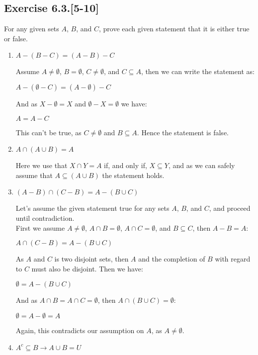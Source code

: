 \documentclass{report}
\newcommand{\cent}[1]{\begin{center}#1\end{center}}
\newcommand{\Exercise}[1]{\subsection{Exercise #1}}
\begin{document}
 	\Exercise{6.3.[5-10]}
 	
 	For any given sets $A$, $B$, and $C$, prove each given statement that it is either true or false.
 	
 	\begin{enumerate}
 		\item $ A - (B - C) = (A-B)-C $
 		
 		Assume $A\neq \emptyset$, $B = \emptyset$, $C \neq \emptyset$, and $C \subseteq A$, then we can write the statement as:
 		
 		\cent{$A - (\emptyset - C) = (A-\emptyset)-C$}
 		
 		And as $X - \emptyset = X$ and $\emptyset - X = \emptyset$ we have:
 		
 		\cent{$A = A-C$}
 		
 		This can't be true, as $C \neq \emptyset$ and $B \subseteq A$. Hence the statement is false.
 		
 		\item $ A \cap (A \cup B) = A $
 		
 		Here we use that $X \cap Y = A$ if, and only if, $X \subseteq Y$,  and as we can safely assume that $A \subseteq (A \cup B)$
 		the statement holds.
 		
 		\item $ (A-B) \cap (C-B) = A - (B \cup C)  $
 		
 		Let's assume the given statement true for any sets $A$, $B$, and $C$, and proceed until contradiction.\\
 		
 		First we assume $A \neq \emptyset$, $A \cap B = \emptyset$, $ A \cap C = \emptyset $, and $B \subseteq C$, then $A-B = A$:
 		
 		\cent{$ A \cap (C-B) = A - (B \cup C)  $}
 		
 		As $A$ and $C$ is two disjoint sets, then $A$ and the completion of $B$ with regard to $C$ must also be disjoint. Then we have:
 		
 		\cent{$ \emptyset = A - (B \cup C)  $}
 		
 		And as $A \cap B = A \cap C = \emptyset$, then $A \cap (B \cup C) = \emptyset$: 		
 		
 		\cent{$ \emptyset = A - \emptyset = A  $}
 		
 		Again, this contradicts our assumption on $A$, as $A \neq \emptyset$.\\
 		
 		\item $ A^c \subseteq B \to A \cup B = U $
 		

\end{enumerate}
\end{document}
